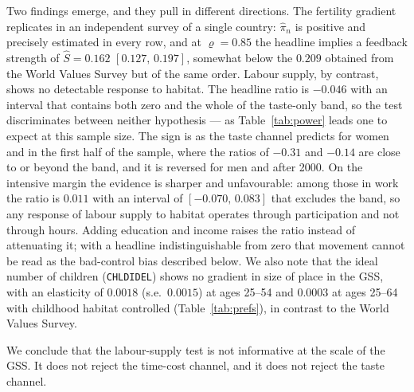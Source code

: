 \documentclass[11pt]{article}
\begin{document}
Two findings emerge, and they pull in different directions. The fertility gradient replicates in
an independent survey of a single country: $\hat\pi_n$ is positive and precisely estimated in every
row, and at $\varrho=0.85$ the headline implies a feedback strength of $\hat S=0.162$
$[0.127,\,0.197]$, somewhat below the $0.209$ obtained from the World Values Survey but of the same
order. Labour supply, by contrast, shows no detectable response to habitat. The headline ratio is
$-0.046$ with an interval that contains both zero and the whole of the taste-only band, so the test
discriminates between neither hypothesis --- as Table~\ref{tab:power} leads one to expect at this
sample size. The sign is as the taste channel predicts for women and in the first half of the
sample, where the ratios of $-0.31$ and $-0.14$ are close to or beyond the band, and it is reversed
for men and after 2000. On the intensive margin the evidence is sharper and unfavourable: among
those in work the ratio is $0.011$ with an interval of $[-0.070,\,0.083]$ that excludes the band,
so any response of labour supply to habitat operates through participation and not through hours.
Adding education and income raises the ratio instead of attenuating it; with a headline
indistinguishable from zero that movement cannot be read as the bad-control bias described below.
We also note that the ideal number of children (\texttt{CHLDIDEL}) shows no gradient in size of
place in the GSS, with an elasticity of $0.0018$ (s.e.\ $0.0015$) at ages 25--54 and $0.0003$ at
ages 25--64 with childhood habitat controlled (Table~\ref{tab:prefs}), in contrast to the World
Values Survey.

We conclude that the labour-supply test is not informative at the scale of the GSS. It does not
reject the time-cost channel, and it does not reject the taste channel.
\end{document}
